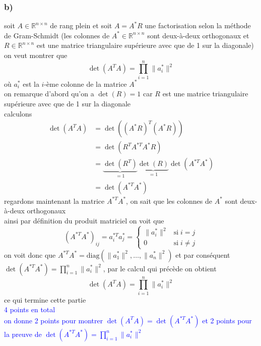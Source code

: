 \documentclass[11pt, a4paper, oneside]{article}
\begin{document}
\subsubsection*{b)}
soit $A\in \mathbb{R}^{n \times n}$ de rang plein et soit $A=A^*R$ une factorisation selon la méthode de Gram-Schmidt {\tiny (les colonnes de $A^* \in \mathbb{R}^{n \times n}$ sont deux-à-deux orthogonaux et $R \in \mathbb{R}^{n \times n}$ est une matrice triangulaire supérieure avec que de 1 sur la diagonale)} \\
on veut montrer que $$\det(A^TA) = \prod_{i=1}^n \lVert a_i^* \rVert^2$$
où $a_i^*$ est la $i$-ème colonne de la matrice $A^*$ \\
on remarque d'abord qu'on a $\det(R)=1$ {\tiny car $R$ est une matrice triangulaire supérieure avec que de 1 sur la diagonale} \\
calculons
\begin{align*}
    \det(A^TA) &= \det((A^*R)^T(A^*R)) \\
    &= \det(R^TA^{*T}A^*R) \\
    &= \underbrace{\det(R^T)}_{=1}\underbrace{\det(R)}_{=1}\det(A^{*T}A^*) \\
    &= \det(A^{*T}A^*)
\end{align*}
regardons maintenant la matrice $A^{*T}A^*$, {\tiny on sait que les colonnes de $A^*$ sont deux-à-deux orthogonaux} \\
ainsi par définition du produit matriciel on voit que
$$(A^{*T}A^*)_{ij} = a_i^{*T}a_j^* = \begin{cases} \lVert a_i^* \rVert^2 & \text{si} \; i=j \\ 0 & \text{si} \; i\neq j \end{cases}$$
on voit donc que $A^{*T}A^* = \text{diag}(\lVert a_1^* \rVert^2, \ldots, \lVert a_n^* \rVert^2)$ et par conséquent $\det(A^{*T}A^*) = \prod_{i=1}^n \lVert a_i^* \rVert^2$, par le calcul qui précède on obtient
$$\det(A^TA) = \prod_{i=1}^n \lVert a_i^* \rVert^2$$
{\tiny ce qui termine cette partie} \\
\textcolor{blue}{4 points en total \\ on donne 2 points pour montrer $\det(A^TA) = \det(A^{*T}A^*)$ et 2 points pour la preuve de $\det(A^{*T}A^*) = \prod_{i=1}^n \lVert a_i^* \rVert^2$}
\end{document}
